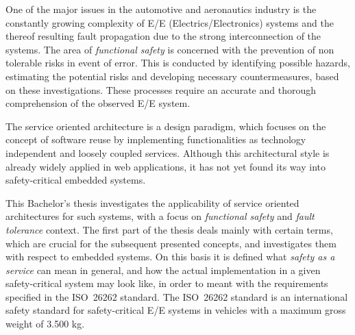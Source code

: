 One of the major issues in the automotive and aeronautics industry is the constantly growing complexity of E/E (Electrics/Electronics) systems and the thereof resulting fault propagation due to the strong interconnection of the systems. The area of \emph{functional safety} is concerned with the prevention of non tolerable risks in event of error. This is conducted by identifying possible hazards, estimating the potential risks and developing necessary countermeasures, based on these investigations. These processes require an accurate and thorough comprehension of the observed E/E system.

The service oriented architecture is a design paradigm, which focuses on the concept of software reuse by implementing functionalities as technology independent and loosely coupled services. Although this architectural style is already widely applied in web applications, it has not yet found its way into safety-critical embedded systems.

This Bachelor's thesis investigates the applicability of service oriented architectures for such systems, with a focus on \emph{functional safety} and \emph{fault tolerance} context. The first part of the thesis deals mainly with certain terms, which are crucial for the subsequent presented concepts, and investigates them with respect to embedded systems. On this basis it is defined what \emph{safety as a service} can mean in general, and how the actual implementation in a given safety-critical system may look like, in order to meant with the requirements specified in the \mbox{ISO 26262} standard. The \mbox{ISO 26262} standard is an international safety standard for safety-critical E/E systems in vehicles with a maximum gross weight of 3.500 kg.